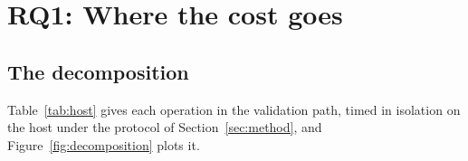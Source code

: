 \documentclass[pdflatex,sn-basic,twocolumn]{sn-jnl}%
\providecommand{\DIFdelbegin}{} %
\newcommand{\DIFscaledelfig}{0.5}
\newlength{\DIFdelgraphicswidth} %
\newlength{\DIFdelgraphicsheight} %
\newcommand{\DIFdelincludegraphics}[2][]{%
\sbox{\DIFdelgraphicsbox}{\DIFOincludegraphics[#1]{#2}}%
\settoboxwidth{\DIFdelgraphicswidth}{\DIFdelgraphicsbox} %
\settoboxtotalheight{\DIFdelgraphicsheight}{\DIFdelgraphicsbox} %
\scalebox{\DIFscaledelfig}{%
\parbox[b]{\DIFdelgraphicswidth}{\usebox{\DIFdelgraphicsbox}\\[-\baselineskip] \rule{\DIFdelgraphicswidth}{0em}}\llap{\resizebox{\DIFdelgraphicswidth}{\DIFdelgraphicsheight}{%
\setlength{\unitlength}{\DIFdelgraphicswidth}%
\begin{picture}(1,1)%
\thicklines\linethickness{2pt} %
{\color[rgb]{1,0,0}\put(0,0){\framebox(1,1){}}}%
{\color[rgb]{1,0,0}\put(0,0){\line( 1,1){1}}}%
{\color[rgb]{1,0,0}\put(0,1){\line(1,-1){1}}}%
\end{picture}%
}\hspace*{3pt}}} %
} %
\DeclareRobustCommand{\DIFdelbegin}{\DIFOdelbegin \let\includegraphics\DIFdelincludegraphics} %
\begin{document}
\section{RQ1: Where the cost goes}\label{sec:rq1}

\subsection{The decomposition}

Table~\ref{tab:host} gives each operation in the validation path, timed in
isolation on the host under the protocol of Section~\ref{sec:method}, and
Figure~\ref{fig:decomposition} plots it.

\DIFdelbegin %
\end{document}

